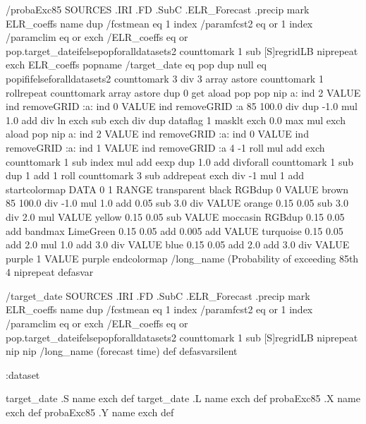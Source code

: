 \begin{ingrid}
/probaExc85 {
 SOURCES .IRI .FD .SubC .ELR_Forecast .precip
  mark ELR_coeffs {name dup /fcstmean eq 1 index /paramfcst2 eq or 1 index /paramclim eq or exch /ELR_coeffs eq or {pop}{.target_date}ifelse}{pop}foralldatasets2
      counttomark
       1 sub
       {[S]regridLB nip}repeat
    exch
    ELR_coeffs {pop}{name /target_date eq {pop}{ dup null eq {pop}if}ifelse}foralldatasets2 counttomark
              3 div
              {3 array astore counttomark 1 roll}repeat
       counttomark array astore
     dup
      0 get
      aload pop
        pop
       nip a:
        ind 2 VALUE
        ind removeGRID
        :a:
         ind 0 VALUE
         ind removeGRID
         :a
       85
        100.0 div
        dup
         -1.0 mul
         1.0 add
         div
        ln exch sub
       exch div
      dup dataflag
       1 masklt
       exch
       0.0 max
       mul
      exch
      {aload pop nip a: ind 2 VALUE ind removeGRID :a: ind 0 VALUE ind removeGRID :a: ind 1 VALUE ind removeGRID :a 4 -1 roll mul add exch counttomark 1 sub index mul add eexp dup 1.0 add div}forall counttomark
         1 sub
         dup
          1 add
          1 roll
         counttomark
          3 sub
          {add}repeat
       exch div
      -1 mul
      1 add
      startcolormap DATA
        0 1 RANGE
        transparent black RGBdup
           0 VALUE
           brown 85
             100.0 div
             -1.0 mul
             1.0 add
             0.05 sub
             3.0 div
             VALUE
            orange 0.15
              0.05 sub
              3.0 div
              2.0 mul
              VALUE
             yellow 0.15
               0.05 sub
               VALUE
              moccasin RGBdup 0.15
                 0.05 add
                 bandmax
                LimeGreen 0.15
                  0.05 add
                  0.005 add
                  VALUE
                 turquoise 0.15
                   0.05 add
                   2.0 mul
                   1.0 add
                   3.0 div
                   VALUE
                  blue 0.15
                    0.05 add
                    2.0 add
                    3.0 div
                    VALUE
                   purple
                    1 VALUE
                    purple endcolormap
      /long_name (Probability of exceeding 85th %
      4 {nip}repeat
}defasvar

/target_date {
 SOURCES .IRI .FD .SubC .ELR_Forecast .precip
  mark ELR_coeffs {name dup /fcstmean eq 1 index /paramfcst2 eq or 1 index /paramclim eq or exch /ELR_coeffs eq or {pop}{.target_date}ifelse}{pop}foralldatasets2
      counttomark
       1 sub
       {[S]regridLB nip}repeat
    nip nip
/long_name (forecast time) def
}defasvarsilent

:dataset

target_date .S name exch def
target_date .L name exch def
probaExc85 .X name exch def
probaExc85 .Y name exch def

\end{ingrid}
